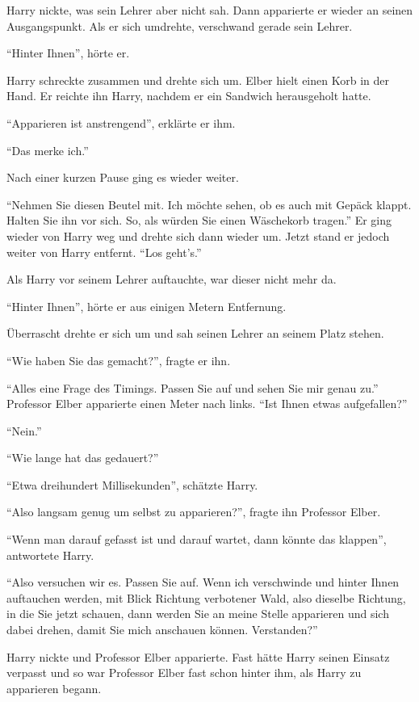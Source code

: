 Harry nickte, was sein Lehrer aber nicht sah. Dann apparierte er wieder an seinen Ausgangspunkt. Als er sich umdrehte, verschwand gerade sein Lehrer.

\enquote{Hinter Ihnen}, hörte er.

Harry schreckte zusammen und drehte sich um. Elber hielt einen Korb in der Hand. Er reichte ihn Harry, nachdem er ein Sandwich herausgeholt hatte.

\enquote{Apparieren ist anstrengend}, erklärte er ihm.

\enquote{Das merke ich.}

Nach einer kurzen Pause ging es wieder weiter.

\enquote{Nehmen Sie diesen Beutel mit. Ich möchte sehen, ob es auch mit Gepäck klappt. Halten Sie ihn vor sich. So, als würden Sie einen Wäschekorb tragen.} Er ging wieder von Harry weg und drehte sich dann wieder um. Jetzt stand er jedoch weiter von Harry entfernt. \enquote{Los geht’s.}

Als Harry vor seinem Lehrer auftauchte, war dieser nicht mehr da.

\enquote{Hinter Ihnen}, hörte er aus einigen Metern Entfernung.

Überrascht drehte er sich um und sah seinen Lehrer an seinem Platz stehen.

\enquote{Wie haben Sie das gemacht?}, fragte er ihn.

\enquote{Alles eine Frage des Timings. Passen Sie auf und sehen Sie mir genau zu.} Professor Elber apparierte einen Meter nach links. \enquote{Ist Ihnen etwas aufgefallen?}

\enquote{Nein.}

\enquote{Wie lange hat das gedauert?}

\enquote{Etwa dreihundert Millisekunden}, schätzte Harry.

\enquote{Also langsam genug um selbst zu apparieren?}, fragte ihn Professor Elber.

\enquote{Wenn man darauf gefasst ist und darauf wartet, dann könnte das klappen}, antwortete Harry.

\enquote{Also versuchen wir es. Passen Sie auf. Wenn ich verschwinde und hinter Ihnen auftauchen werden, mit Blick Richtung verbotener Wald, also dieselbe Richtung, in die Sie jetzt schauen, dann werden Sie an meine Stelle apparieren und sich dabei drehen, damit Sie mich anschauen können. Verstanden?}

Harry nickte und Professor Elber apparierte. Fast hätte Harry seinen Einsatz verpasst und so war Professor Elber fast schon hinter ihm, als Harry zu apparieren begann.

